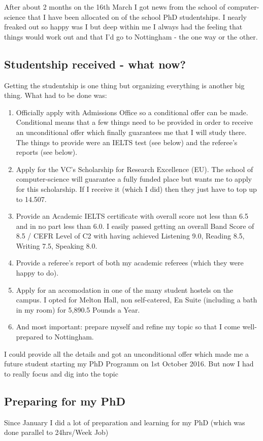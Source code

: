 After about 2 months on the 16th March I got news from the school of computer-science that I have been allocated on of the school PhD studentships. I nearly freaked out so happy was I but deep within me I always had the feeling that things would work out and that I'd go to Nottingham - the one way or the other. 

\subsection{Studentship received - what now?}
Getting the studentship is one thing but organizing everything is another big thing. What had to be done was:

\begin{enumerate}
\item Officially apply with Admissions Office so a conditional offer can be made. Conditional means that a few things need to be provided in order to receive an unconditional offer which finally guarantees me that I will study there. The things to provide were an IELTS test (see below) and the referee's reports (see below).
\item Apply for the VC's Scholarship for Research Excellence (EU). The school of computer-science will guarantee a fully funded place but wants me to apply for this scholarship. If I receive it (which I did) then they just have to top up to 14.507.
\item Provide an Academic IELTS certificate with overall score not less than 6.5 and in no part less than 6.0. I easily passed getting an overall Band Score of 8.5 / CEFR Level of C2 with having achieved Listening 9.0, Reading 8.5, Writing 7.5, Speaking 8.0.
\item Provide a referee's report of both my academic referees (which they were happy to do).
\item Apply for an accomodation in one of the many student hostels on the campus. I opted for Melton Hall, non self-catered, En Suite (including a bath in my room) for 5,890.5 Pounds a Year. 
\item And most important: prepare myself and refine my topic so that I come well-prepared to Nottingham.
\end{enumerate}

I could provide all the details and got an unconditional offer which made me a future student starting my PhD Programm on 1st October 2016. But now I had to really focus and dig into the topic

\subsection{Preparing for my PhD}
Since January I did a lot of preparation and learning for my PhD (which was done parallel to 24hrs/Week Job)

